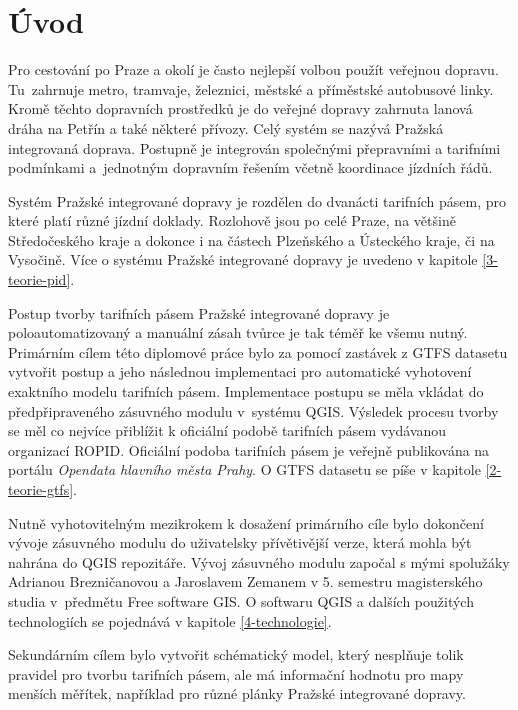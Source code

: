 \chapter*{Úvod}
\label{0-uvod}

Pro cestování po Praze a okolí je často nejlepší volbou použít veřejnou dopravu. 
Tu~zahrnuje metro, tramvaje, železnici, městské a příměstské autobusové linky.
Kromě těchto dopravních prostředků je do veřejné dopravy zahrnuta lanová dráha na Petřín a také některé přívozy. 
Celý systém se nazývá Pražská integrovaná doprava. Po\-stupně je integrován společnými přepravními
a tarifními podmínkami a~jednotným dopravním řešením včetně koordinace jízdních řádů.

Systém Pražské integrované dopravy je rozdělen do dvanácti tarifních pásem, pro
které platí různé jízdní doklady. Rozlohově jsou po celé Praze, na většině
Středočeského kraje a dokonce i na částech Plzeňského a Ústeckého kraje, či na Vysočině.
Více o systému Pražské integrované dopravy je uvedeno v kapitole \ref{3-teorie-pid}.

Postup tvorby tarifních pásem Pražské integrované dopravy je poloautomatizovaný
a manuální zásah tvůrce je tak téměř ke všemu nutný.
Primárním cílem této diplomové práce bylo za pomocí zastávek z GTFS datasetu vytvořit 
postup a jeho následnou implementaci pro automatické vyhotovení exaktního modelu tarifních pásem.
Implementace postupu se měla vkládat do předpřipraveného zásuvného mo\-dulu v~systému QGIS.
Výsledek procesu tvorby se měl co nejvíce přiblížit k oficiální podobě tarifních pásem
vydávanou organizací ROPID. 
Oficiální podoba tarifních pásem je veřejně publikována na portálu \textit{Opendata hlavního města Prahy}.
O GTFS datasetu se píše v kapitole \ref{2-teorie-gtfs}.

Nutně vyhotovitelným mezikrokem k dosažení primárního cíle bylo dokončení
vývoje zásuvného modulu do uživatelsky přívětivější verze, která mohla být nahrána do QGIS repozitáře.
Vývoj zásuvného modulu započal s mými spolužáky Adrianou Brezničanovou a Jaroslavem
Zemanem v 5. semestru magisterského studia v~předmětu Free software GIS.
O softwaru QGIS a dalších použitých technologiích se pojednává v kapitole \ref{4-technologie}. 

Sekundárním cílem bylo vytvořit schématický model, který nesplňuje tolik
pravi\-del pro tvorbu tarifních pásem, ale má informační hodnotu pro mapy menších měřítek,
například pro různé plánky Pražské integrované dopravy.

